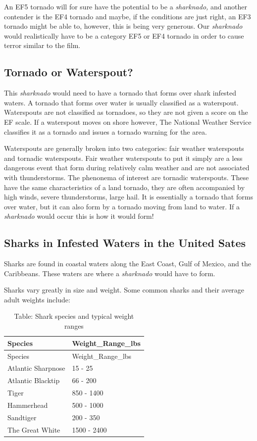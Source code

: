 \documentclass[
  letterpaper,
  DIV=11,
  numbers=noendperiod]{scrreprt}
\begin{document}
An EF5 tornado will for sure have the potential to be a
\emph{sharknado,} and another contender is the EF4 tornado and maybe, if
the conditions are just right, an EF3 tornado might be able to, however,
this is being very generous. Our \emph{sharknado} would realistically
have to be a category EF5 or EF4 tornado in order to cause terror
similar to the film.

\subsection{Tornado or Waterspout?}\label{tornado-or-waterspout}

This \emph{sharknado} would need to have a tornado that forms over shark
infested waters. A tornado that forms over water is usually classified
as a waterspout. Waterspouts are not classified as tornadoes, so they
are not given a score on the EF scale. If a waterspout moves on shore
however, The National Weather Service classifies it as a tornado and
issues a tornado warning for the area.

Waterspouts are generally broken into two categories: fair weather
waterspouts and tornadic waterspouts. Fair weather waterspouts to put it
simply are a less dangerous event that form during relatively calm
weather and are not associated with thunderstorms. The phenonema of
interest are tornadic waterspouts. These have the same characteristics
of a land tornado, they are often accompanied by high winds, severe
thunderstorms, large hail. It is essentially a tornado that forms over
water, but it can also form by a tornado moving from land to water. If a
\emph{sharknado} would occur this is how it would form!

\subsection{Sharks in Infested Waters in the United
Sates}\label{sharks-in-infested-waters-in-the-united-sates}

Sharks are found in coastal waters along the East Coast, Gulf of Mexico,
and the Caribbeans. These waters are where a \emph{sharknado} would have
to form.

Sharks vary greatly in size and weight. Some common sharks and their
average adult weights include:

\begin{longtable}[]{@{}ll@{}}
\caption{Table: Shark species and typical weight ranges}\tabularnewline
\toprule\noalign{}
Species & Weight\_Range\_lbs \\
\midrule\noalign{}
\endfirsthead
\toprule\noalign{}
Species & Weight\_Range\_lbs \\
\midrule\noalign{}
\endhead
\bottomrule\noalign{}
\endlastfoot
Atlantic Sharpnose & 15 - 25 \\
Atlantic Blacktip & 66 - 200 \\
Tiger & 850 - 1400 \\
Hammerhead & 500 - 1000 \\
Sandtiger & 200 - 350 \\
The Great White & 1500 - 2400 \\
\end{longtable}
\end{document}
